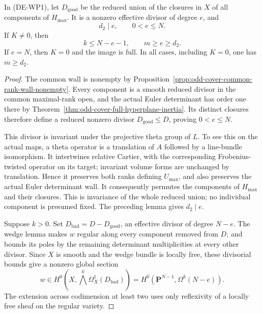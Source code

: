 \begin{theorem}
\label{thm:DE-Lang-theta-wedge-quotient-bound}
In (DE-WP1), let \(D_{\mathrm{good}}\) be the reduced union
of the closures in \(X\) of all components of \(H_{\max}\).
It is a nonzero effective divisor of degree \(e\), and
\[
             d_2\mid e,\qquad 0<e\le N.
 \tag{DE-WP5}
\]
If \(K\ne0\), then
\[
             k\le N-e-1,
             \qquad m\ge e\ge d_2.
 \tag{DE-WP6}
\]
If \(e=N\), then \(K=0\) and the image is full.
In all cases, including \(K=0\), one has \(m\ge d_2\).
\end{theorem}
\begin{proof}
The common wall is nonempty by
Proposition~\ref{prop:odd-cover-common-rank-wall-nonempty}.
Every component is a smooth reduced divisor in the common
maximal-rank open, and the actual Euler determinant has order
one there by Theorem~\ref{thm:odd-cover-full-hyperplane-inertia}.
Its distinct closures therefore define a reduced nonzero divisor
\(D_{\mathrm{good}}\le D\), proving \(0<e\le N\).

This divisor is invariant under the projective theta group of
\(L\). To see this on the actual maps, a theta operator is a
translation of \(A\) followed by a line-bundle isomorphism.
It intertwines relative Cartier, with the corresponding
Frobenius-twisted operator on its target; invariant volume forms
are unchanged by translation. Hence it preserves both ranks
defining \(U_{\max}\), and also preserves the actual Euler
determinant wall. It consequently permutes the components of
\(H_{\max}\) and their closures. This is invariance of the
whole reduced union; no individual component is presumed fixed.
The preceding lemma gives \(d_2\mid e\).

Suppose \(k>0\). Set \(D_{\mathrm{bad}}=D-D_{\mathrm{good}}\),
an effective divisor of degree \(N-e\). The wedge lemma makes
\(w\) regular along every component removed from \(D\), and
bounds its poles by the remaining determinant multiplicities
at every other divisor. Since \(X\) is smooth and the wedge
bundle is locally free, these divisorial bounds give a nonzero
global section
\[
  w\in H^0\!\left(X,\bigwedge^k\Omega_X^1
                                  (D_{\mathrm{bad}})\right)
    =H^0\!\left(\mathbf P^{N-1},\Omega^k(N-e)\right).
 \tag{DE-WP7}
\]
The extension across codimension at least two uses only
reflexivity of a locally free sheaf on the regular variety.


\end{proof}
